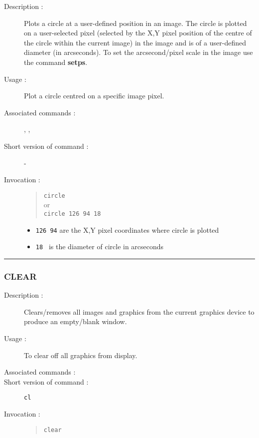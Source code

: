 \begin{description}

\item[Description :] Plots a circle at a user-defined position in an
image.  The circle is plotted on a user-selected pixel (selected by the
X,Y pixel position of the centre of the circle within the current
image) in the image and is of a user-defined diameter (in arcseconds).
To set the arcsecond/pixel scale in the image use the command {\bf setps}.

\item[Usage :] Plot a circle centred on a specific image pixel.
\item[Associated commands :] {\tt {}}, 
{\tt {}}, {\tt {}}
\item[Short version of command :] -
\item[Invocation :]

\begin{quote}{\tt  circle }\\
or \\
{\tt circle 126 94 18 }
\end{quote}

\begin{itemize}

\item {\tt 126 94} are the X,Y pixel coordinates where circle is plotted
\item {\tt 18 } is the diameter of circle in arcseconds
\end{itemize}

\end{description}

\hrule 
\subsubsection*{\label{CLEAR}CLEAR}

\begin{description}

\item[Description :] Clears/removes all images and graphics from the
current graphics device to produce an empty/blank window.

\item[Usage :] To clear off all graphics from display.
\item[Associated commands :] {\tt {}}
\item[Short version of command :] {\tt cl}
\item[Invocation :]

\begin{quote}{\tt  clear }\end{quote}

\end{description}

